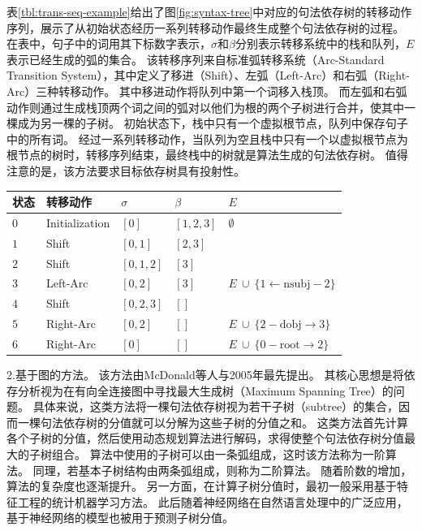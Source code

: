 表\ref{tbl:trans-seq-example}给出了图\ref{fig:syntax-tree}中对应的句法依存树的转移动作序列，展示了从初始状态经历一系列转移动作最终生成整个句法依存树的过程。
在表中，句子中的词用其下标数字表示，$\sigma$和$\beta$分别表示转移系统中的栈和队列，$E$表示已经生成的弧的集合。
该转移序列来自标准弧转移系统（Arc-Standard Transition System），其中定义了移进（Shift）、左弧（Left-Arc）和右弧（Right-Arc）三种转移动作。
其中移进动作将队列中第一个词移入栈顶。
而左弧和右弧动作则通过生成栈顶两个词之间的弧对以他们为根的两个子树进行合并，使其中一棵成为另一棵的子树。
初始状态下，栈中只有一个虚拟根节点，队列中保存句子中的所有词。
经过一系列转移动作，当队列为空且栈中只有一个以虚拟根节点为根节点的树时，转移序列结束，最终栈中的树就是算法生成的句法依存树。
值得注意的是，该方法要求目标依存树具有投射性。

\begin{table}[thbp]
	\vspace{0.5em}\centering\wuhao
	\begin{tabular}{C{3em}L{7em}R{4.5em}L{4em}L{9em}}
		\toprule[1.5pt]
		状态 & 转移动作 & $\sigma$ & $\beta$ & $E$ \\
		\midrule[1pt]
		$0$ & Initialization & $[0]$ & $[1, 2, 3]$ & $\emptyset $ \\
		$1$ & Shift & $[0, 1]$ & $[2, 3]$ &  \\
		$2$ & Shift & $[0, 1, 2]$ & $[3]$ &  \\
		$3$ & Left-Arc & $[0, 2]$ & $[3]$ & $E\ \cup\ \{1\leftarrow \textrm{nsubj}-2\}$ \\
		$4$ & Shift & $[0, 2, 3]$ & $[]$ &  \\
		$5$ & Right-Arc & $[0, 2]$ & $[]$ & $E\ \cup\ \{2- \textrm{dobj}\rightarrow3\}$ \\
        $6$ & Right-Arc & $[0]$ & $[]$ & $E\ \cup\ \{0- \textrm{root}\rightarrow2\}$ \\
		\bottomrule[1.5pt]
	\end{tabular}
\end{table}

2.基于图的方法。
该方法由McDonald等人\cite{mcdonald-etal-2005-online}与2005年最先提出。
其核心思想是将依存分析视为在有向全连接图中寻找最大生成树（Maximum Spanning Tree）的问题。
具体来说，这类方法将一棵句法依存树视为若干子树（subtree）的集合，因而一棵句法依存树的分值就可以分解为这些子树的分值之和。
这类方法首先计算各个子树的分值，然后使用动态规划算法进行解码，求得使整个句法依存树分值最大的子树组合。
算法中使用的子树可以由一条弧组成，这时该方法称为一阶算法。
同理，若基本子树结构由两条弧组成，则称为二阶算法。\cite{carreras-2007-experiments}
随着阶数的增加，算法的复杂度也逐渐提升。
另一方面，在计算子树分值时，最初一般采用基于特征工程的统计机器学习方法。
此后随着神经网络在自然语言处理中的广泛应用，基于神经网络的模型也被用于预测子树分值。

